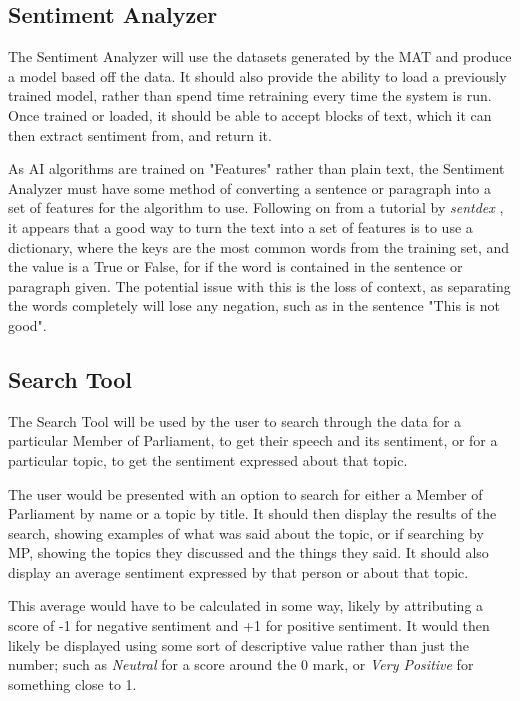 \subsection{Sentiment Analyzer}
\label{sec:des_sentiment_analyzer}
The Sentiment Analyzer will use the datasets generated by the MAT and produce a model based off the data. It should also provide the ability to load a previously trained model, rather than spend time retraining every time the system is run. Once trained or loaded, it should be able to accept blocks of text, which it can then extract sentiment from, and return it.

As AI algorithms are trained on "Features" rather than plain text, the Sentiment Analyzer must have some method of converting a sentence or paragraph into a set of features for the algorithm to use. Following on from a tutorial by \emph{sentdex} \cite{NLTKYoutubePlaylist}, it appears that a good way to turn the text into a set of features is to use a dictionary, where the keys are the most common words from the training set, and the value is a True or False, for if the word is contained in the sentence or paragraph given. The potential issue with this is the loss of context, as separating the words completely will lose any negation, such as in the sentence "This is not good".

\subsection{Search Tool}
\label{sec:des_search_tool}
The Search Tool will be used by the user to search through the data for a particular Member of Parliament, to get their speech and its sentiment, or for a particular topic, to get the sentiment expressed about that topic.

The user would be presented with an option to search for either a Member of Parliament by name or a topic by title. It should then display the results of the search, showing examples of what was said about the topic, or if searching by MP, showing the topics they discussed and the things they said. It should also display an average sentiment expressed by that person or about that topic.

This average would have to be calculated in some way, likely by attributing a score of -1 for negative sentiment and +1 for positive sentiment. It would then likely be displayed using some sort of descriptive value rather than just the number; such as \emph{Neutral} for a score around the 0 mark, or \emph{Very Positive} for something close to 1.


